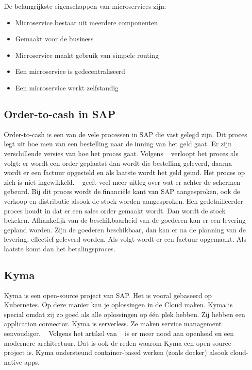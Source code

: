 De belangrijkste eigenschappen van microservices zijn:
\begin{itemize}
	\item Microservice bestaat uit meerdere componenten
	\item Gemaakt voor de business
	\item Microservice maakt gebruik van simpele routing
	\item Een microservice is gedecentraliseerd
	\item Een microservice werkt zelfstandig
\end{itemize}

\subsection{Order-to-cash in SAP}
Order-to-cash is een van de vele processen in SAP die vast gelegd zijn. Dit proces legt uit hoe men van een bestelling naar de inning van het geld gaat. Er zijn verschillende versies van hoe het proces gaat. Volgens ~\cite{Akthar2018} verloopt het proces als volgt: er wordt een order geplaatst dan wordt die bestelling geleverd, daarna wordt er een factuur opgesteld en als laatste wordt het geld geind. Het proces op zich is niet ingewikkeld. ~\cite{OpenSap2018} geeft veel meer uitleg over wat er achter de schermen gebeurd. Bij dit proces wordt de financiële kant van SAP aangesproken, ook de verkoop en distributie alsook de stock worden aangesproken. Een gedetailleerder proces houdt in dat er een sales order gemaakt wordt. Dan wordt de stock bekeken. Afhankelijk van de beschikbaarheid van de goederen kan er een levering gepland worden. Zijn de goederen beschikbaar, dan kan er na de planning van de levering, effectief geleverd worden. Als volgt wordt er een factuur opgemaakt. Als laatste komt dan het betalingsproces. 

\subsection{Kyma}
Kyma is een open-source project van SAP. Het is vooral gebaseerd op Kubernetes. Op deze manier kan je oplossingen in de Cloud maken. Kyma is special omdat zij zo goed als alle oplossingen op één plek hebben. Zij hebben een application connector. Kyma is serverless. Ze maken service management eenvoudiger. ~\cite{Kyma2019}
Volgens het artikel van ~\cite{Semerdzhiev2018} is er meer nood aan openheid en een modernere architectuur. Dat is ook de reden waarom Kyma een open source project is. Kyma ondersteund container-based werken (zoals docker) alsook cloud-native apps. 

